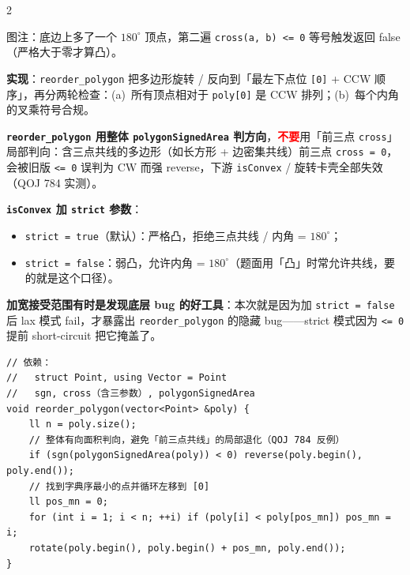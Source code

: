 \begin{multicols*}{2}
\begin{center}
			\vspace{2pt}
			{\footnotesize\sffamily\color{gray} 图注：底边上多了一个 $180^{\circ}$ 顶点，第二遍 \texttt{cross(a, b) <= 0} 等号触发返回 false（严格大于零才算凸）。}
		\end{center}

		\textbf{实现}：\texttt{reorder\_polygon} 把多边形旋转 / 反向到「最左下点位 \texttt{[0]} + CCW 顺序」，再分两轮检查：(a)~所有顶点相对于 \texttt{poly[0]} 是 CCW 排列；(b)~每个内角的叉乘符号合规。

		\textbf{\texttt{reorder\_polygon} 用整体 \texttt{polygonSignedArea} 判方向}，\textcolor{red}{\textbf{不要}}用「前三点 \texttt{cross}」局部判向：含三点共线的多边形（如长方形 + 边密集共线）前三点 \texttt{cross = 0}，会被旧版 \texttt{<= 0} 误判为 CW 而强 reverse，下游 \texttt{isConvex} / 旋转卡壳全部失效（QOJ 784 实测）。

		\textbf{\texttt{isConvex} 加 \texttt{strict} 参数}：
		\begin{itemize}
					\setlength\itemsep{0pt}
				\item \texttt{strict = true}（默认）：严格凸，拒绝三点共线 / 内角 = $180^{\circ}$；
				\item \texttt{strict = false}：弱凸，允许内角 = $180^{\circ}$（题面用「凸」时常允许共线，要的就是这个口径）。
		\end{itemize}
		\textbf{加宽接受范围有时是发现底层 bug 的好工具}：本次就是因为加 \texttt{strict = false} 后 lax 模式 fail，才暴露出 \texttt{reorder\_polygon} 的隐藏 bug——strict 模式因为 \texttt{<= 0} 提前 short-circuit 把它掩盖了。

		\begin{verbatim}
// 依赖：
//   struct Point, using Vector = Point
//   sgn, cross（含三参数）, polygonSignedArea
void reorder_polygon(vector<Point> &poly) {
	ll n = poly.size();
	// 整体有向面积判向，避免「前三点共线」的局部退化（QOJ 784 反例）
	if (sgn(polygonSignedArea(poly)) < 0) reverse(poly.begin(), poly.end());
	// 找到字典序最小的点并循环左移到 [0]
	ll pos_mn = 0;
	for (int i = 1; i < n; ++i) if (poly[i] < poly[pos_mn]) pos_mn = i;
	rotate(poly.begin(), poly.begin() + pos_mn, poly.end());
}


\end{verbatim}
\end{multicols*}
